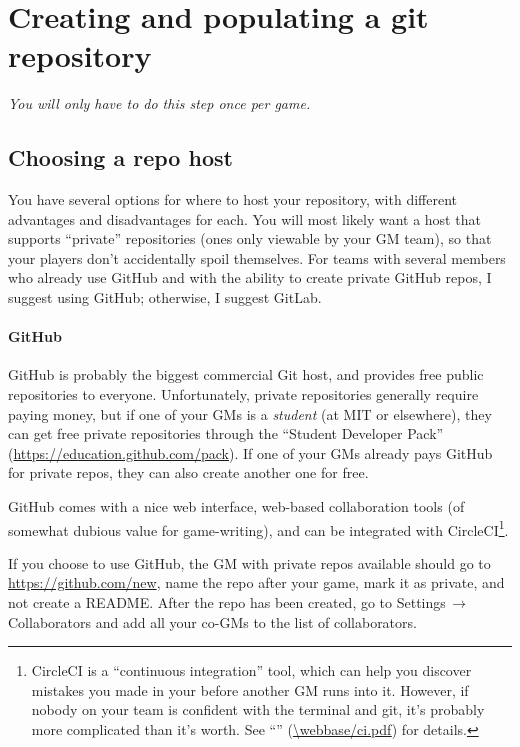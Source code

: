 \documentclass[green]{testgame}
\begin{document}
\section{Creating and populating a git repository}

{\em You will only have to do this step once per game.}

\subsection{Choosing a repo host}

You have several options for where to host your repository, with different advantages and disadvantages for each. You will most likely want a host that supports ``private'' repositories (ones only viewable by your GM team), so that your players don't accidentally spoil themselves. For teams with several members who already use GitHub and with the ability to create private GitHub repos, I suggest using GitHub; otherwise, I suggest GitLab.

\paragraph*{GitHub} GitHub is probably the biggest commercial Git host, and provides free public repositories to everyone. Unfortunately, private repositories generally require paying money, but if one of your GMs is a \emph{student} (at MIT or elsewhere), they can get free private repositories through the ``Student Developer Pack'' (\url{https://education.github.com/pack}). If one of your GMs already pays GitHub for private repos, they can also create another one for free.

GitHub comes with a nice web interface, web-based collaboration tools (of somewhat dubious value for game-writing), and can be integrated with CircleCI\footnote{CircleCI is a ``continuous integration'' tool, which can help you discover mistakes you made in your \gametex{} before another GM runs into it. However, if nobody on your team is confident with the terminal and git, it's probably more complicated than it's worth. See ``\gCI{}'' (\url{\webbase/ci.pdf}) for details.}.

If you choose to use GitHub, the GM with private repos available should go to \url{https://github.com/new}, name the repo after your game, mark it as private, and not create a README. After the repo has been created, go to Settings$\,\to\,$Collaborators and add all your co-GMs to the list of collaborators.
\end{document}

